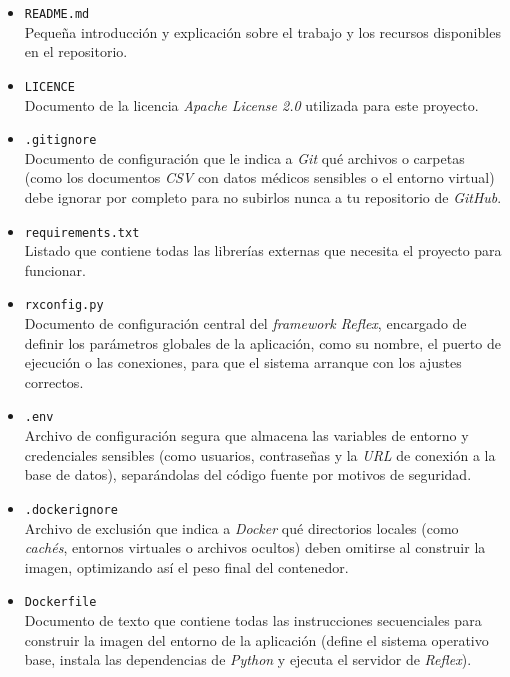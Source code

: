 \begin{itemize}
	\item \texttt{README.md}\\Pequeña introducción y explicación sobre el trabajo y los recursos disponibles en el repositorio.
	
	\item \texttt{LICENCE}\\Documento de la licencia \textit{Apache License 2.0} utilizada para este proyecto.
	
	\item \texttt{.gitignore}\\Documento de configuración que le indica a \textit{Git} qué archivos o carpetas (como los documentos \textit{CSV} con datos médicos sensibles o el entorno virtual) debe ignorar por completo para no subirlos nunca a tu repositorio de \textit{GitHub}.
	
	\item \texttt{requirements.txt}\\Listado que contiene todas las librerías externas que necesita el proyecto para funcionar.
	
	\item \texttt{rxconfig.py}\\Documento de configuración central del \textit{framework Reflex}, encargado de definir los parámetros globales de la aplicación, como su nombre, el puerto de ejecución o las conexiones, para que el sistema arranque con los ajustes correctos.
	
	\item \texttt{.env} \\Archivo de configuración segura que almacena las variables de entorno y credenciales sensibles (como usuarios, contraseñas y la \textit{URL} de conexión a la base de datos), separándolas del código fuente por motivos de seguridad.
	
	\item \texttt{.dockerignore} \\Archivo de exclusión que indica a \textit{Docker} qué directorios locales (como \textit{cachés}, entornos virtuales o archivos ocultos) deben omitirse al construir la imagen, optimizando así el peso final del contenedor.
	
	\item \texttt{Dockerfile} \\Documento de texto que contiene todas las instrucciones secuenciales para construir la imagen del entorno de la aplicación (define el sistema operativo base, instala las dependencias de \textit{Python} y ejecuta el servidor de \textit{Reflex}).
	

\end{itemize}
